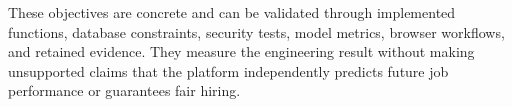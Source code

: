 \documentclass[12pt,a4paper,oneside]{report}
\begin{document}
These objectives are concrete and can be validated through implemented functions,
database constraints, security tests, model metrics, browser workflows, and retained
evidence. They measure the engineering result without making unsupported claims that
the platform independently predicts future job performance or guarantees fair hiring.

\end{document}

